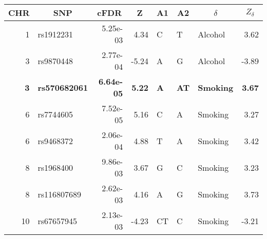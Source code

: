 \begin{center}
\begin{tabular}{rlrrlllr}
\hline\hline
\multicolumn{1}{c}{CHR}&\multicolumn{1}{c}{SNP}&\multicolumn{1}{c}{cFDR}&\multicolumn{1}{c}{Z}&\multicolumn{1}{c}{A1}&\multicolumn{1}{c}{A2}&\multicolumn{1}{c}{$\delta$}&\multicolumn{1}{c}{$Z_{\delta}$}\tabularnewline
\hline
    1&   rs1912231&   5.25e-03&    4.34&   C&   T&   Alcohol&    3.62\tabularnewline
    3&   rs9870448&   2.77e-04&   -5.24&   A&   G&   Alcohol&   -3.89\tabularnewline
\bfseries    3&\bfseries   rs570682061&\bfseries   6.64e-05&\bfseries    5.22&\bfseries   A&\bfseries   AT&\bfseries   Smoking&\bfseries    3.67\tabularnewline
    6&   rs7744605&   7.52e-05&    5.16&   C&   A&   Smoking&    3.27\tabularnewline
    6&   rs9468372&   2.06e-04&    4.88&   T&   A&   Smoking&    3.42\tabularnewline
    8&   rs1968400&   9.86e-03&    3.67&   G&   C&   Smoking&    3.23\tabularnewline
    8&   rs116807689&   2.62e-03&    4.16&   A&   G&   Smoking&    3.73\tabularnewline
   10&   rs67657945&   2.13e-03&   -4.23&   CT&   C&   Smoking&   -3.21\tabularnewline
\hline
\end{tabular}\end{center}
